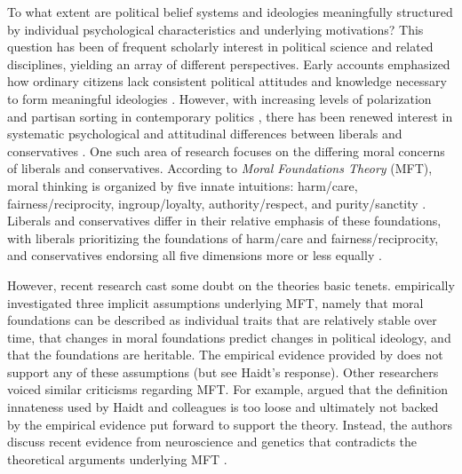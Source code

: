 \documentclass[12pt]{article}
\begin{document}
To what extent are political belief systems and ideologies meaningfully structured by individual psychological characteristics and underlying motivations? This question has been of frequent scholarly interest in political science and related disciplines, yielding an array of different perspectives. Early accounts emphasized how ordinary citizens lack consistent political attitudes and knowledge necessary to form meaningful ideologies \citep[e.g.][]{converse1964nature}. However, with increasing levels of polarization and partisan sorting in contemporary politics \citep{iyengar2015fear}, there has been renewed interest in systematic psychological and attitudinal differences between liberals and conservatives \citep{jost2006end}. One such area of research focuses on the differing moral concerns of liberals and conservatives. According to \textit{Moral Foundations Theory} (MFT), moral thinking is organized by five innate intuitions: harm/care, fairness/reciprocity, ingroup/loyalty, authority/respect, and purity/sanctity \citep{haidt2008moral,graham2011mapping}. Liberals and conservatives differ in their relative emphasis of these foundations, with liberals prioritizing the foundations of harm/care and fairness/reciprocity, and conservatives endorsing all five dimensions more or less equally \citep{graham2009liberals}.

However, recent research cast some doubt on the theories basic tenets. \citet{smith2016intuitive} empirically investigated three implicit assumptions underlying MFT, namely that moral foundations can be described as individual traits that are relatively stable over time, that changes in moral foundations predict changes in political ideology, and that the foundations are heritable. The empirical evidence provided by \citet{smith2016intuitive} does not support any of these assumptions (but see Haidt's response). Other researchers voiced similar criticisms regarding MFT. For example, \citet{suhler2011can} argued that the definition innateness used by Haidt and colleagues is too loose and ultimately not backed by the empirical evidence put forward to support the theory. Instead, the authors discuss recent evidence from neuroscience and genetics that contradicts the theoretical arguments underlying MFT \citep{suhler2011can}.
\end{document}
